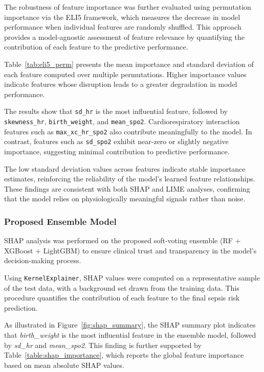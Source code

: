 \documentclass[conference]{IEEEtran}
\begin{document}
\FloatBarrier

\FloatBarrier

The robustness of feature importance was further evaluated using permutation importance via the ELI5 framework, which measures the decrease in model performance when individual features are randomly shuffled. This approach provides a model-agnostic assessment of feature relevance by quantifying the contribution of each feature to the predictive performance.

Table~\ref{tab:eli5_perm} presents the mean importance and standard deviation of each feature computed over multiple permutations. Higher importance values indicate features whose disruption leads to a greater degradation in model performance.

The results show that \texttt{sd\_hr} is the most influential feature, followed by \texttt{skewness\_hr}, \texttt{birth\_weight}, and \texttt{mean\_spo2}. Cardiorespiratory interaction features such as \texttt{max\_xc\_hr\_spo2} also contribute meaningfully to the model. In contrast, features such as \texttt{sd\_spo2} exhibit near-zero or slightly negative importance, suggesting minimal contribution to predictive performance.

The low standard deviation values across features indicate stable importance estimates, reinforcing the reliability of the model's learned feature relationships. These findings are consistent with both SHAP and LIME analyses, confirming that the model relies on physiologically meaningful signals rather than noise.\\

\FloatBarrier



\subsubsection{Proposed Ensemble Model  }SHAP analysis was performed on the proposed soft-voting ensemble (RF + XGBoost + LightGBM) to ensure clinical trust and transparency in the model’s decision-making process.

Using \texttt{KernelExplainer}, SHAP values were computed on a representative sample of the test data, with a background set drawn from the training data. This procedure quantifies the contribution of each feature to the final sepsis risk prediction.

As illustrated in Figure~\ref{fig:shap_summary}, the SHAP summary plot indicates that \textit{birth\_weight} is the most influential feature in the ensemble model, followed by \textit{sd\_hr} and \textit{mean\_spo2}. This finding is further supported by Table~\ref{table:shap_importance}, which reports the global feature importance based on mean absolute SHAP values.
\end{document}
